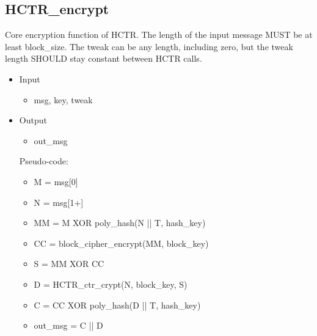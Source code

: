 \documentclass[i-d]{rfc}
\begin{document}
\subsection{HCTR\_encrypt}
Core encryption function of HCTR. The length of the input message MUST be at least block\_size. The tweak can be any length, including zero, but the tweak length SHOULD stay constant between HCTR calls.
\begin{itemize}
    \item Input
    \begin{itemize}
        \item msg, key, tweak
    \end{itemize}
    \item Output
    \begin{itemize}
        \item out\_msg
    \end{itemize}
    Pseudo-code:
    \begin{itemize}
        \item M = msg[0]
        \item N = msg[1+]
        \item MM = M XOR poly\_hash(N || T, hash\_key)
        \item CC = block\_cipher\_encrypt(MM, block\_key)
        \item S = MM XOR CC
        \item D = HCTR\_ctr\_crypt(N, block\_key, S)
        \item C = CC XOR poly\_hash(D || T, hash\_key)
        \item out\_msg = C || D
    \end{itemize}
\end{itemize}
\end{document}
